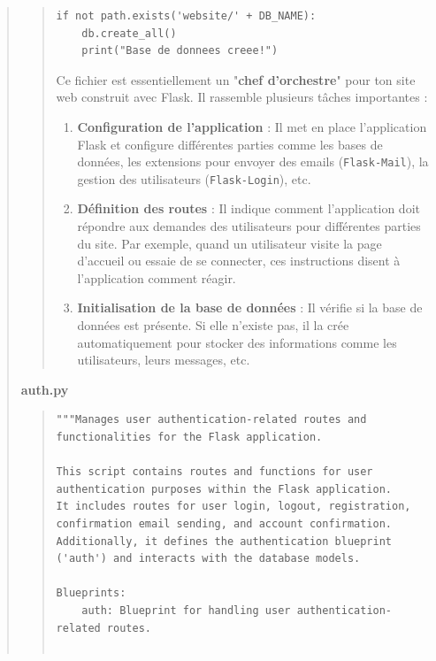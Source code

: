 \documentclass{article}
\begin{document}
\begin{quote}
\begin{quote}
\begin{tcolorbox}[colback=grisClair,colframe=black]
\begin{lstlisting}
if not path.exists('website/' + DB_NAME):
    db.create_all()
    print("Base de donnees creee!")
        \end{lstlisting}
        \end{tcolorbox}
        \vspace*{1\baselineskip}

        Ce fichier est essentiellement un "\textbf{chef d'orchestre}" pour ton site web construit avec Flask. Il rassemble plusieurs tâches importantes :
        \begin{enumerate}
            \item \textbf{Configuration de l'application} : Il met en place l'application Flask et configure différentes parties comme les bases de données, les extensions pour envoyer des emails (\texttt{Flask-Mail}), la gestion des utilisateurs (\texttt{Flask-Login}), etc.
            \item \textbf{Définition des routes} : Il indique comment l'application doit répondre aux demandes des utilisateurs pour différentes parties du site. Par exemple, quand un utilisateur visite la page d'accueil ou essaie de se connecter, ces instructions disent à l'application comment réagir.
            \item \textbf{Initialisation de la base de données} : Il vérifie si la base de données est présente. Si elle n'existe pas, il la crée automatiquement pour stocker des informations comme les utilisateurs, leurs messages, etc.
        \end{enumerate}

        
    \end{quote}
    
    \newpage
    \textbf{auth.py}
    \vspace*{1\baselineskip}
    \begin{quote}
        \begin{tcolorbox}[colback=grisClair,colframe=black]
            \begin{lstlisting}
"""Manages user authentication-related routes and functionalities for the Flask application.

This script contains routes and functions for user authentication purposes within the Flask application.
It includes routes for user login, logout, registration, confirmation email sending, and account confirmation.
Additionally, it defines the authentication blueprint ('auth') and interacts with the database models.

Blueprints:
    auth: Blueprint for handling user authentication-related routes.


\end{lstlisting}
\end{tcolorbox}
\end{quote}
\end{quote}
\end{document}
